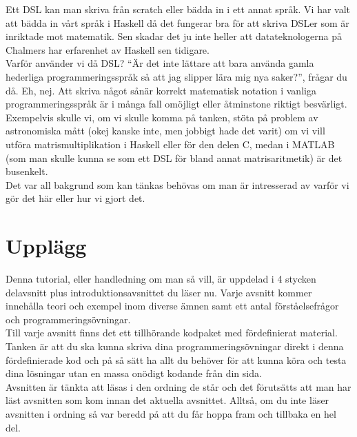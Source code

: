 \documentclass{article}
\begin{document}
Ett DSL kan man skriva från scratch eller bädda in i ett annat språk. Vi har valt att bädda in vårt språk i Haskell då det fungerar bra för att skriva DSLer som är inriktade mot matematik. Sen skadar det ju inte heller att datateknologerna på Chalmers har erfarenhet av Haskell sen tidigare.\\

Varför använder vi då DSL? “Är det inte lättare att bara använda gamla hederliga programmeringsspråk så att jag slipper lära mig nya saker?”, frågar du då. Eh, nej. Att skriva något sånär korrekt matematisk notation i vanliga programmeringsspråk är i många fall omöjligt eller åtminstone riktigt besvärligt. \\
Exempelvis skulle vi, om vi skulle komma på tanken, stöta på problem av astronomiska mått (okej kanske inte, men jobbigt hade det varit) om vi vill utföra matrismultiplikation i Haskell eller för den delen C, medan i MATLAB (som man skulle kunna se som ett DSL för bland annat matrisaritmetik) är det busenkelt.\\

Det var all bakgrund som kan tänkas behövas om man är intresserad av varför vi gör det här eller hur vi gjort det. 



\section{Upplägg}
Denna tutorial, eller handledning om man så vill, är uppdelad i 4 stycken delavsnitt plus introduktionsavsnittet du läser nu. Varje avsnitt kommer innehålla teori och exempel inom diverse ämnen samt ett antal förståelsefrågor och programmeringsövningar. \\

Till varje avsnitt finns det ett tillhörande kodpaket med fördefinierat material. Tanken är att du ska kunna skriva dina programmeringsövningar direkt i denna fördefinierade kod och på så sätt ha allt du behöver för att kunna köra och testa dina lösningar utan en massa onödigt kodande från din sida.\\

Avsnitten är tänkta att läsas i den ordning de står och det förutsätts att man har läst avsnitten som kom innan det aktuella avsnittet. Alltså, om du inte läser avsnitten i ordning så var beredd på att du får hoppa fram och tillbaka en hel del.
\end{document}
